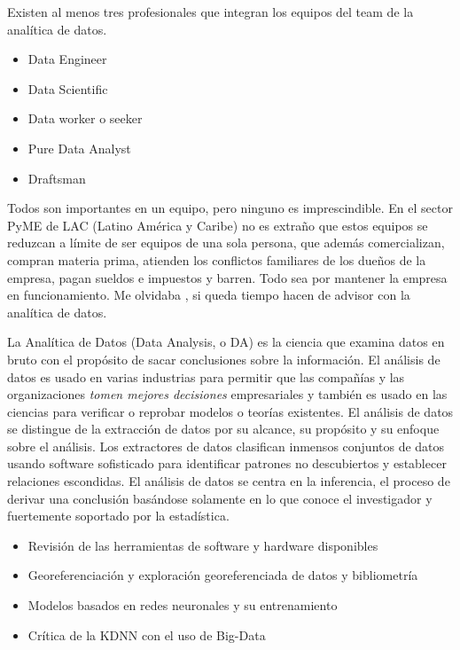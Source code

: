 \documentclass[]{article}
\providecommand{\tightlist}{%
  \setlength{\itemsep}{0pt}\setlength{\parskip}{0pt}}
\begin{document}
Existen al menos tres profesionales que integran los equipos del team de
la analítica de datos.

\begin{itemize}
\tightlist
\item
  Data Engineer
\item
  Data Scientific
\item
  Data worker o seeker
\item
  Pure Data Analyst
\item
  Draftsman
\end{itemize}

Todos son importantes en un equipo, pero ninguno es imprescindible. En
el sector PyME de LAC (Latino América y Caribe) no es extraño que estos
equipos se reduzcan a límite de ser equipos de una sola persona, que
además comercializan, compran materia prima, atienden los conflictos
familiares de los dueños de la empresa, pagan sueldos e impuestos y
barren. Todo sea por mantener la empresa en funcionamiento. Me olvidaba
, si queda tiempo hacen de advisor con la analítica de datos.

La Analítica de Datos (Data Analysis, o DA) es la ciencia que examina
datos en bruto con el propósito de sacar conclusiones sobre la
información. El análisis de datos es usado en varias industrias para
permitir que las compañías y las organizaciones \emph{tomen mejores
decisiones} empresariales y también es usado en las ciencias para
verificar o reprobar modelos o teorías existentes. El análisis de datos
se distingue de la extracción de datos por su alcance, su propósito y su
enfoque sobre el análisis. Los extractores de datos clasifican inmensos
conjuntos de datos usando software sofisticado para identificar patrones
no descubiertos y establecer relaciones escondidas. El análisis de datos
se centra en la inferencia, el proceso de derivar una conclusión
basándose solamente en lo que conoce el investigador y fuertemente
soportado por la estadística.

\begin{itemize}
\tightlist
\item
  Revisión de las herramientas de software y hardware disponibles
\item
  Georeferenciación y exploración georeferenciada de datos y
  bibliometría
\item
  Modelos basados en redes neuronales y su entrenamiento
\item
  Crítica de la KDNN con el uso de Big-Data
\end{itemize}
\end{document}

